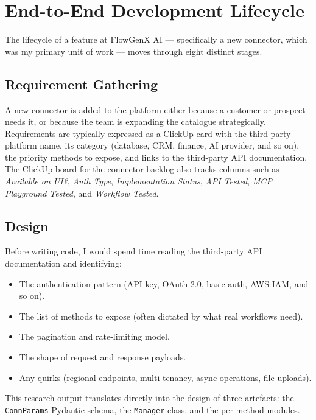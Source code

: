 \section{End-to-End Development Lifecycle}
The lifecycle of a feature at FlowGenX AI --- specifically a new
connector, which was my primary unit of work --- moves through eight
distinct stages.

\subsection{Requirement Gathering}
A new connector is added to the platform either because a customer or
prospect needs it, or because the team is expanding the catalogue
strategically. Requirements are typically expressed as a ClickUp card
with the third-party platform name, its category (database, CRM,
finance, AI provider, and so on), the priority methods to expose, and
links to the third-party API documentation. The ClickUp board for the
connector backlog also tracks columns such as \emph{Available on UI?},
\emph{Auth Type}, \emph{Implementation Status}, \emph{API Tested},
\emph{MCP Playground Tested}, and \emph{Workflow Tested}.

\subsection{Design}
Before writing code, I would spend time reading the third-party API
documentation and identifying:

\begin{itemize}[leftmargin=*]
    \item The authentication pattern (API key, OAuth 2.0, basic auth,
    AWS IAM, and so on).
    \item The list of methods to expose (often dictated by what real
    workflows need).
    \item The pagination and rate-limiting model.
    \item The shape of request and response payloads.
    \item Any quirks (regional endpoints, multi-tenancy, async
    operations, file uploads).
\end{itemize}

This research output translates directly into the design of three
artefacts: the \texttt{ConnParams} Pydantic schema, the
\texttt{Manager} class, and the per-method modules.

